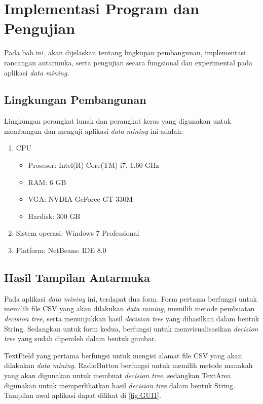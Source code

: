 \chapter{Implementasi Program dan Pengujian}

Pada bab ini, akan dijelaskan tentang lingkupan pembangunan, implementasi rancangan antarmuka, serta pengujian secara fungsional dan experimental pada aplikasi \textsl{data mining}.

\section{Lingkungan Pembangunan}
Lingkungan perangkat lunak dan perangkat keras yang digunakan untuk membangun dan menguji aplikasi \textsl{data mining} ini adalah:

\begin{enumerate}
	\item CPU
	\begin{itemize}
		\item Prosesor: Intel(R) Core(TM) i7, 1.60 GHz
		\item RAM: 6 GB
		\item VGA: NVDIA GeForce GT 330M
		\item Hardisk: 300 GB
	\end{itemize}
	\item Sistem operasi: Windows 7 Professional
	\item Platform: NetBeans: IDE 8.0
\end{enumerate}

\section{Hasil Tampilan Antarmuka}
Pada aplikasi \textsl{data mining} ini, terdapat dua form. Form pertama berfungsi untuk memilih file CSV yang akan dilakukan \textsl{data mining}, memilih metode pembuatan \textsl{decision tree}, serta menunjukkan hasil \textsl{decision tree} yang dihasilkan dalam bentuk String. Sedangkan untuk form kedua, berfungsi untuk memvisualisasikan \textsl{decision tree} yang sudah diperoleh dalam bentuk gambar.

TextField yang pertama berfungsi untuk mengisi alamat file CSV yang akan dilakukan \textsl{data mining}. RadioButton berfungsi untuk memilih metode manakah yang akan digunakan untuk membuat \textsl{decision tree}, sedangkan TextArea digunakan untuk memperlihatkan hasil \textsl{decision tree} dalam bentuk String. Tampilan awal aplikasi dapat dilihat di \ref{fig:GUI1}.

